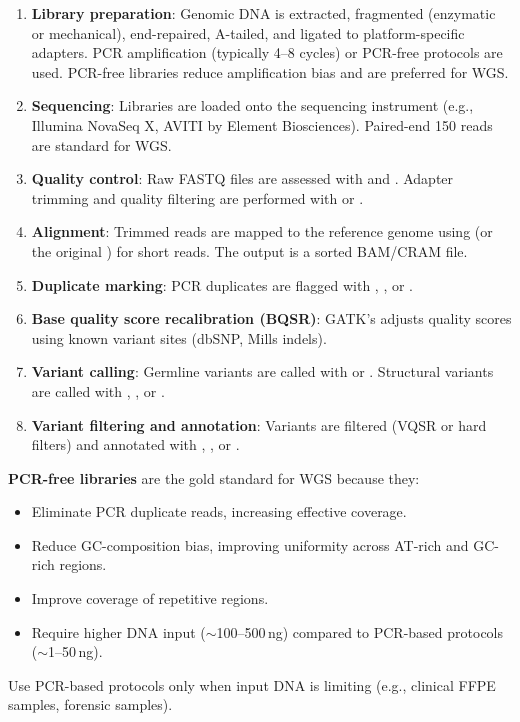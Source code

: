 \begin{enumerate}[nosep]
  \item \textbf{Library preparation}: Genomic DNA is extracted, fragmented (enzymatic or mechanical), end-repaired, A-tailed, and ligated to platform-specific adapters. PCR amplification (typically 4--8 cycles) or PCR-free protocols are used. PCR-free libraries reduce amplification bias and are preferred for WGS.
  \item \textbf{Sequencing}: Libraries are loaded onto the sequencing instrument (e.g., Illumina NovaSeq X, AVITI by Element Biosciences). Paired-end 150\basepair{} reads are standard for WGS.
  \item \textbf{Quality control}: Raw FASTQ files are assessed with  and . Adapter trimming and quality filtering are performed with  or .
  \item \textbf{Alignment}: Trimmed reads are mapped to the reference genome using  (or the original ) for short reads. The output is a sorted BAM/CRAM file.
  \item \textbf{Duplicate marking}: PCR duplicates are flagged with , , or .
  \item \textbf{Base quality score recalibration (BQSR)}: GATK's  adjusts quality scores using known variant sites (dbSNP, Mills indels).
  \item \textbf{Variant calling}: Germline variants are called with  or . Structural variants are called with , , or .
  \item \textbf{Variant filtering and annotation}: Variants are filtered (VQSR or hard filters) and annotated with , , or .
\end{enumerate}

\begin{protocolbox}[title={PCR-Free vs.\ PCR-Based WGS Libraries}]
\textbf{PCR-free libraries} are the gold standard for WGS because they:
\begin{itemize}[nosep]
  \item Eliminate PCR duplicate reads, increasing effective coverage.
  \item Reduce GC-composition bias, improving uniformity across AT-rich and GC-rich regions.
  \item Improve coverage of repetitive regions.
  \item Require higher DNA input ($\sim$100--500\,ng) compared to PCR-based protocols ($\sim$1--50\,ng).
\end{itemize}
Use PCR-based protocols only when input DNA is limiting (e.g., clinical FFPE samples, forensic samples).
\end{protocolbox}

